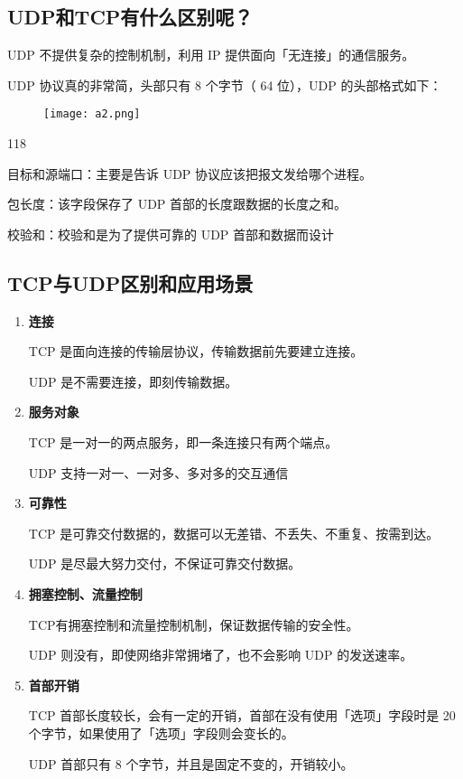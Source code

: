 \documentclass[cn,chinese,color=cyan]{elegantbook}
\begin{document}
\subsection{UDP和TCP有什么区别呢？}
UDP 不提供复杂的控制机制，利用 IP 提供面向「无连接」的通信服务。

UDP 协议真的非常简，头部只有 8 个字节（ 64 位），UDP 的头部格式如下：

\begin{figure}[H]
	\centering
	\texttt{[image: a2.png]}
\end{figure}
\begin{dinglist}{118}
	\item 目标和源端口：主要是告诉 UDP 协议应该把报文发给哪个进程。
	\item 包长度：该字段保存了 UDP 首部的长度跟数据的长度之和。
	\item 校验和：校验和是为了提供可靠的 UDP 首部和数据而设计
\end{dinglist}
\subsection{TCP与UDP区别和应用场景}
\begin{enumerate}
	\item \textbf{连接}
	
	TCP 是面向连接的传输层协议，传输数据前先要建立连接。
	
	UDP 是不需要连接，即刻传输数据。
	
	\item \textbf{服务对象}
	
	TCP 是一对一的两点服务，即一条连接只有两个端点。
	
	UDP 支持一对一、一对多、多对多的交互通信
	
	\item \textbf{ 可靠性}
	
	TCP 是可靠交付数据的，数据可以无差错、不丢失、不重复、按需到达。
	
	UDP 是尽最大努力交付，不保证可靠交付数据。
	
	\item \textbf{拥塞控制、流量控制}
	
	TCP有拥塞控制和流量控制机制，保证数据传输的安全性。
	
	UDP 则没有，即使网络非常拥堵了，也不会影响 UDP 的发送速率。
	
	\item\textbf{ 首部开销}
	
	TCP 首部长度较长，会有一定的开销，首部在没有使用「选项」字段时是 20 个字节，如果使用了「选项」字段则会变长的。
	
	UDP 首部只有 8 个字节，并且是固定不变的，开销较小。
\end{enumerate}
\end{document}
